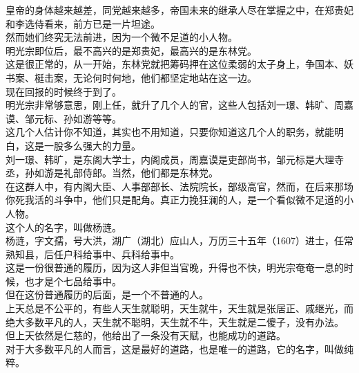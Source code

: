 \begin{multicols}{\theparacolNo}
皇帝的身体越来越差，同党越来越多，帝国未来的继承人尽在掌握之中，在郑贵妃和李选侍看来，前方已是一片坦途。\\

然而她们终究无法前进，因为一个微不足道的小人物。\\

明光宗即位后，最不高兴的是郑贵妃，最高兴的是东林党。\\

这是很正常的，从一开始，东林党就把筹码押在这位柔弱的太子身上，争国本、妖书案、梃击案，无论何时何地，他们都坚定地站在这一边。\\

现在回报的时候终于到了。\\

明光宗非常够意思，刚上任，就升了几个人的官，这些人包括刘一璟、韩旷、周嘉谟、邹元标、孙如游等等。\\

这几个人估计你不知道，其实也不用知道，只要你知道这几个人的职务，就能明白，这是一股多么强大的力量。\\

刘一璟、韩旷，是东阁大学士，内阁成员，周嘉谟是吏部尚书，邹元标是大理寺丞，孙如游是礼部侍郎。当然，他们都是东林党。\\

在这群人中，有内阁大臣、人事部部长、法院院长，部级高官，然而，在后来那场你死我活的斗争中，他们只是配角。真正力挽狂澜的人，是一个看似微不足道的小人物。\\

这个人的名字，叫做杨涟。\\

杨涟，字文孺，号大洪，湖广（湖北）应山人，万历三十五年（1607）进士，任常熟知县，后任户科给事中、兵科给事中。\\

这是一份很普通的履历，因为这人非但当官晚，升得也不快，明光宗奄奄一息的时候，也才是个七品给事中。\\

但在这份普通履历的后面，是一个不普通的人。\\

上天总是不公平的，有些人天生就聪明，天生就牛，天生就是张居正、戚继光，而绝大多数平凡的人，天生就不聪明，天生就不牛，天生就是二傻子，没有办法。\\

但上天依然是仁慈的，他给出了一条没有天赋，也能成功的道路。\\

对于大多数平凡的人而言，这是最好的道路，也是唯一的道路，它的名字，叫做纯粹。\\


\end{multicols}
